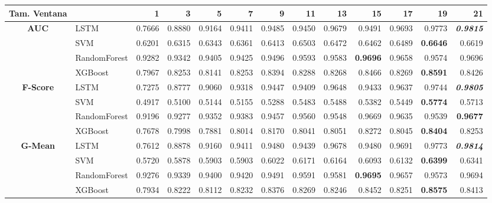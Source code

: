 \begin{table}[H]
	\centering
	\begin{adjustbox}{max width=12cm}
		\begin{tabular}{|c|l|r|r|r|r|r|r|r|r|r|r|r|}
			\hline
			\textbf{Tam. Ventana}&         &      1  &      3  &      5  &      7  &      9  &      11 &      13 &      15 &      17 &      19 &      21 \\
			\hline
			\textbf{AUC} & LSTM &  0.7666 &  0.8880 &  0.9164 &  0.9411 &  0.9485 &  0.9450 &  0.9679 &  0.9491 &  0.9693 &  0.9773 &  \textit{\textbf{0.9815}} \\
			& SVM &  0.6201 &  0.6315 &  0.6343 &  0.6361 &  0.6413 &  0.6503 &  0.6472 &  0.6462 &  0.6489 &  \textbf{0.6646} &  0.6619 \\
			& RandomForest &  0.9282 &  0.9342 &  0.9405 &  0.9425 &  0.9496 &  0.9593 &  0.9583 &  \textbf{0.9696} &  0.9658 &  0.9574 &  0.9696 \\
			& XGBoost &  0.7967 &  0.8253 &  0.8141 &  0.8253 &  0.8394 &  0.8288 &  0.8268 &  0.8466 &  0.8269 &  \textbf{0.8591} &  0.8426 \\
			\hline
			\textbf{F-Score} & LSTM &  0.7275 &  0.8777 &  0.9060 &  0.9318 &  0.9447 &  0.9409 &  0.9648 &  0.9433 &  0.9637 &  0.9744 &  \textit{\textbf{0.9805}} \\
			& SVM &  0.4917 &  0.5100 &  0.5144 &  0.5155 &  0.5288 &  0.5483 &  0.5488 &  0.5382 &  0.5449 &  \textbf{0.5774} &  0.5713 \\
			& RandomForest &  0.9196 &  0.9277 &  0.9352 &  0.9383 &  0.9457 &  0.9560 &  0.9548 &  0.9669 &  0.9635 &  0.9539 &  \textbf{0.9677} \\
			& XGBoost &  0.7678 &  0.7998 &  0.7881 &  0.8014 &  0.8170 &  0.8041 &  0.8051 &  0.8272 &  0.8045 &  \textbf{0.8404} &  0.8253 \\
			\hline
			\textbf{G-Mean} & LSTM &  0.7612 &  0.8878 &  0.9160 &  0.9411 &  0.9480 &  0.9439 &  0.9678 &  0.9480 &  0.9691 &  0.9773 &  \textit{\textbf{0.9814}} \\
			& SVM &  0.5720 &  0.5878 &  0.5903 &  0.5903 &  0.6022 &  0.6171 &  0.6164 &  0.6093 &  0.6132 &  \textbf{0.6399} &  0.6341 \\
			& RandomForest &  0.9276 &  0.9339 &  0.9400 &  0.9420 &  0.9491 &  0.9591 &  0.9581 &  \textbf{0.9695} &  0.9657 &  0.9573 &  0.9694 \\
			& XGBoost &  0.7934 &  0.8222 &  0.8112 &  0.8232 &  0.8376 &  0.8269 &  0.8246 &  0.8452 &  0.8251 &  \textbf{0.8575} &  0.8413 \\

\end{tabular}
\end{adjustbox}
\end{table}

